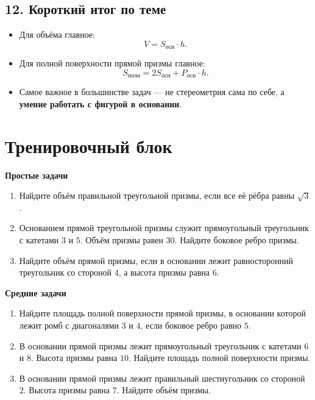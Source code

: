 \documentclass[a4paper,12pt]{article}
\newcommand{\Area}{S}
\newcommand{\Vol}{V}
\newcommand{\per}{P}
\begin{document}
\subsection*{12. Короткий итог по теме}

\begin{itemize}
    \item Для объёма главное:
    \[
    \Vol=\Area_{\text{осн}}\cdot h.
    \]
    \item Для полной поверхности прямой призмы главное:
    \[
    \Area_{\text{полн}}=2\Area_{\text{осн}}+\per_{\text{осн}}\cdot h.
    \]
    \item Самое важное в большинстве задач --- не стереометрия сама по себе, а \textbf{умение работать с фигурой в основании}.
\end{itemize}

\newpage

\section*{Тренировочный блок}

\textbf{Простые задачи}

\begin{enumerate}[label=\arabic*.]
    \item Найдите объём правильной треугольной призмы, если все её рёбра равны $\sqrt{3}$.
    
    \item Основанием прямой треугольной призмы служит прямоугольный треугольник с катетами $3$ и $5$. Объём призмы равен $30$. Найдите боковое ребро призмы.
    
    \item Найдите объём прямой призмы, если в основании лежит равносторонний треугольник со стороной $4$, а высота призмы равна $6$.
\end{enumerate}

\textbf{Средние задачи}

\begin{enumerate}[label=\arabic*.,resume]
    \item Найдите площадь полной поверхности прямой призмы, в основании которой лежит ромб с диагоналями $3$ и $4$, если боковое ребро равно $5$.
    
    \item В основании прямой призмы лежит прямоугольный треугольник с катетами $6$ и $8$. Высота призмы равна $10$. Найдите площадь полной поверхности призмы.
    
    \item В основании прямой призмы лежит правильный шестиугольник со стороной $2$. Высота призмы равна $7$. Найдите объём призмы.
\end{enumerate}
\end{document}
